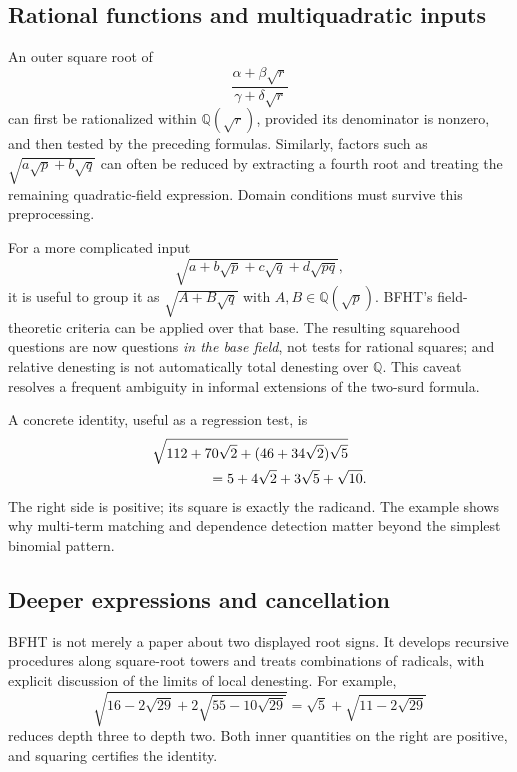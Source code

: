 \documentclass[11pt,a4paper]{article}
\newcommand{\Q}{\mathbb{Q}}
\theoremstyle{definition}
\theoremstyle{remark}
\numberwithin{equation}{section}
\begin{document}
\subsection{Rational functions and multiquadratic inputs}

An outer square root of
\[
 \frac{\alpha+\beta\sqrt r}{\gamma+\delta\sqrt r}
\]
can first be rationalized within $\Q(\sqrt r)$, provided its denominator is nonzero, and then tested by the preceding formulas. Similarly, factors such as $\sqrt{a\sqrt p+b\sqrt q}$ can often be reduced by extracting a fourth root and treating the remaining quadratic-field expression. Domain conditions must survive this preprocessing.

For a more complicated input
\[
 \sqrt{a+b\sqrt p+c\sqrt q+d\sqrt{pq}},
\]
it is useful to group it as $\sqrt{A+B\sqrt q}$ with $A,B\in\Q(\sqrt p)$. BFHT's field-theoretic criteria can be applied over that base. The resulting squarehood questions are now questions \emph{in the base field}, not tests for rational squares; and relative denesting is not automatically total denesting over $\Q$. This caveat resolves a frequent ambiguity in informal extensions of the two-surd formula.\cite{bfht,mo410388}

A concrete identity, useful as a regression test, is
\begin{align}\label{eq:multi}
 &\sqrt{112+70\sqrt2+(46+34\sqrt2)\sqrt5}\\
 &\hspace{1.4cm}=5+4\sqrt2+3\sqrt5+\sqrt{10}.\nonumber
\end{align}
The right side is positive; its square is exactly the radicand. The example shows why multi-term matching and dependence detection matter beyond the simplest binomial pattern.\cite{bfht,sympysource}

\subsection{Deeper expressions and cancellation}

BFHT is not merely a paper about two displayed root signs. It develops recursive procedures along square-root towers and treats combinations of radicals, with explicit discussion of the limits of local denesting. For example,
\begin{equation}\label{eq:deep}
 \sqrt{16-2\sqrt{29}+2\sqrt{55-10\sqrt{29}}}
 =\sqrt5+\sqrt{11-2\sqrt{29}}
\end{equation}
reduces depth three to depth two. Both inner quantities on the right are positive, and squaring certifies the identity.\cite{bfht}
\end{document}
